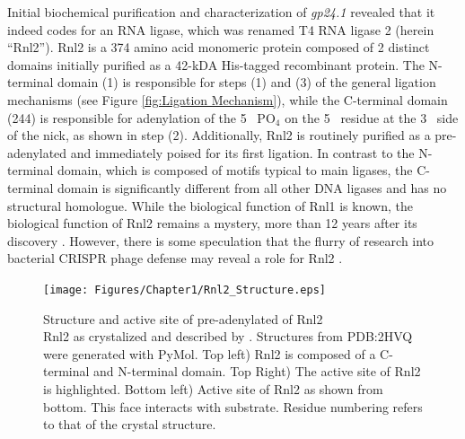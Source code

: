 Initial biochemical purification and characterization of \textit{gp24.1} \citep{Ho2002b} revealed that it indeed codes for an RNA ligase, which was renamed T4 RNA ligase 2 (herein ``Rnl2''). Rnl2 is a 374 amino acid monomeric protein composed of 2 distinct domains initially purified as a 42-kDA His-tagged recombinant protein. The N-terminal domain (1) is responsible for steps (1) and (3) of the general ligation mechanisms (see Figure \ref{fig:Ligation Mechanism}), while the C-terminal domain (244) is responsible for adenylation of the 5\textprime~ PO$_{4}$ on the 5\textprime~ residue at the 3\textprime~ side of the nick, as shown in step (2). Additionally, Rnl2 is routinely purified as a pre-adenylated and immediately poised for its first ligation. In contrast to the N-terminal domain, which is composed of motifs typical to main ligases, the C-terminal domain is significantly	different from all other DNA ligases and has no structural homologue. While the biological function of Rnl1 is known, the biological function of Rnl2 remains a mystery, more than 12 years after its discovery \citep{Chauleau2013b}. However, there is some speculation that the flurry of research into bacterial CRISPR phage defense may reveal a role for Rnl2 \citep{Barrangou2007c,Chauleau2013b}.

\begin{figure}[htbp]
	\centering 
	\texttt{[image: Figures/Chapter1/Rnl2\_Structure.eps]}
	\caption[Structure and active site of pre-adenylated of Rnl2]
	{
		Structure and active site of pre-adenylated of Rnl2\\[0.25cm]
		Rnl2 as crystalized and described by \citep{Nandakumar2006}. Structures from PDB:2HVQ were generated with PyMol. Top left) Rnl2 is composed of a C-terminal and N-terminal domain. Top Right) The active site of Rnl2 is highlighted. Bottom left) Active site of Rnl2 as shown from bottom. This face interacts with substrate. Residue numbering refers to that of the crystal structure.
	}
	\label{fig:Rnl2 General Structure}
\end{figure}

